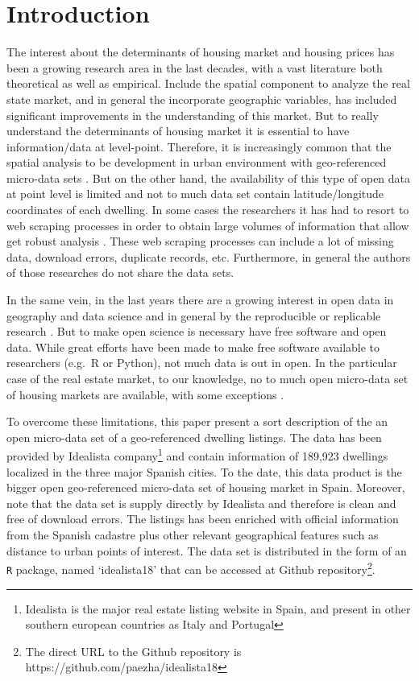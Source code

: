 \documentclass[Royal,times,sageh]{sagej}
\begin{document}
\hypertarget{introduction}{%
\section{Introduction}\label{introduction}}

The interest about the determinants of housing market and housing prices
has been a growing research area in the last decades, with a vast
literature both theoretical as well as empirical. Include the spatial
component to analyze the real state market, and in general the
incorporate geographic variables, has included significant improvements
in the understanding of this market. But to really understand the
determinants of housing market it is essential to have information/data
at level-point. Therefore, it is increasingly common that the spatial
analysis to be development in urban environment with geo-referenced
micro-data sets \citep{lopez2015}. But on the other hand, the
availability of this type of open data at point level is limited and not
to much data set contain latitude/longitude coordinates of each
dwelling. In some cases the researchers it has had to resort to web
scraping processes in order to obtain large volumes of information that
allow get robust analysis
\citep{gupta2022take, arbia2020spatial, Li2019, lopez2015}. These web
scraping processes can include a lot of missing data, download errors,
duplicate records, etc. Furthermore, in general the authors of those
researches do not share the data sets.

In the same vein, in the last years there are a growing interest in open
data in geography and data science
\citep{arribasl2021editorial, arribas2021} and in general by the
reproducible or replicable research \citep{paez2021open}. But to make
open science is necessary have free software and open data. While great
efforts have been made to make free software available to researchers
(e.g.~R or Python), not much data is out in open. In the particular case
of the real estate market, to our knowledge, no to much open micro-data
set of housing markets are available, with some exceptions
\citep{Song2021}.

To overcome these limitations, this paper present a sort description of
the an open micro-data set of a geo-referenced dwelling listings. The
data has been provided by Idealista
company\footnote{Idealista is the major real estate listing website in Spain, and present in other southern european countries as Italy and Portugal}
and contain information of 189,923 dwellings localized in the three
major Spanish cities. To the date, this data product is the bigger open
geo-referenced micro-data set of housing market in Spain. Moreover, note
that the data set is supply directly by Idealista and therefore is clean
and free of download errors. The listings has been enriched with
official information from the Spanish cadastre plus other relevant
geographical features such as distance to urban points of interest. The
data set is distributed in the form of an \texttt{R} package, named
`idealista18' that can be accessed at Github
repository\footnote{The direct URL to the Github repository is https://github.com/paezha/idealista18}.
\end{document}
